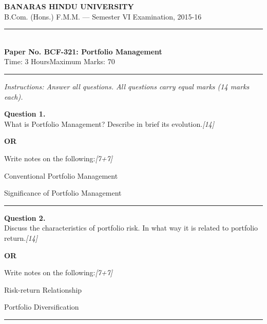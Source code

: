 \documentclass[11pt,a4paper]{article}
\newcommand{\pts}[1]{\hfill   \textit{[#1]}}
\begin{document}
\begin{center}
  {\large\bfseries BANARAS HINDU UNIVERSITY}\\[2pt]
  {\normalsize B.Com. (Hons.) F.M.M. --- Semester VI Examination, 2015-16}\\[6pt]
  \rule{0.8\linewidth}{0.5pt}\\[6pt]
  {\large\bfseries Paper No. BCF-321: Portfolio Management}\\[4pt]
  {\normalsize Time: 3 Hours\hfill Maximum Marks: 70}
\end{center}

\rule{\linewidth}{0.4pt}

\smallskip



\noindent   \textit{Instructions: Answer all questions. All questions carry equal marks (14 marks each).}

\bigskip




\noindent   \textbf{Question 1.} \\
What is Portfolio Management? Describe in brief its evolution.\pts{14}

\centerline{   \textbf{OR}}

Write notes on the following:\pts{7+7}

\begin{parts}
  \item Conventional Portfolio Management
  \item Significance of Portfolio Management
\end{parts}

\medskip\rule{\linewidth}{0.2pt}




\noindent   \textbf{Question 2.} \\
Discuss the characteristics of portfolio risk. In what way it is related to portfolio return.\pts{14}

\centerline{   \textbf{OR}}

Write notes on the following:\pts{7+7}

\begin{parts}
  \item Risk-return Relationship
  \item Portfolio Diversification
\end{parts}

\medskip\rule{\linewidth}{0.2pt}

\pagebreak
\end{document}
